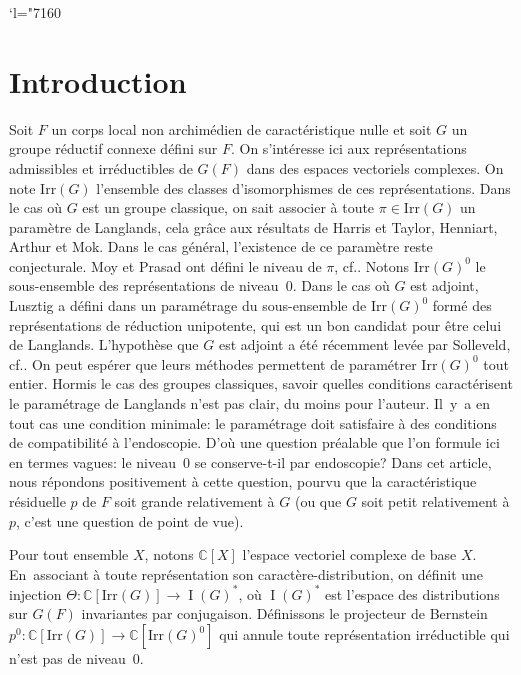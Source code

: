 \documentclass[11pt]{article}
\newcommand{\cf}{cf.\xspace}
\numberwithin{equation}{section}\providecommand{\og}{«\,}\providecommand{\fg}{\,»}
\newcommand{\Changel}{\mathcode`l="7160}
\newcommand{\Irr}{\mathrm{Irr}}
\DeclareMathOperator{\rI}{I}
\newcommand{\CC}{\mathbb{C}}
\theoremstyle{plain}
\theoremstyle{definition}
\begin{document}
\Changel

\vspace*{-1.2\baselineskip}\vskip0pt
\enlargethispage{.3\baselineskip}%
\section*{Introduction}

Soit $F$ un corps local non archimédien de caractéristique nulle et soit $G$ un groupe réductif connexe défini sur $F$. On s'intéresse ici aux représentations admissibles et irréductibles de $G(F)$ dans des espaces vectoriels complexes. On note $\Irr(G)$ l'ensemble des classes d'isomorphismes de ces représentations. Dans le cas où $G$ est un groupe classique, on sait associer à toute $\pi\in \Irr(G)$ un paramètre de Langlands, cela grâce aux résultats de Harris et Taylor, Henniart, Arthur et Mok. Dans le cas général, l'existence de ce paramètre reste conjecturale.
Moy et Prasad ont défini le niveau de $\pi$, \cf \cite[Th.\,5.2]{MP1}. Notons $\Irr(G)^0$ le sous-ensemble des représentations de niveau~$0$. Dans le cas où $G$ est adjoint, Lusztig a défini dans \cite{Lu} un paramétrage du sous-ensemble de $\Irr(G)^0$ formé des représentations de réduction unipotente, qui est un bon candidat pour être celui de Langlands. L'hypothèse que $G$ est adjoint a été récemment levée par Solleveld, \cf \cite{S}. On peut espérer que leurs méthodes permettent de paramétrer $\Irr(G)^0$ tout entier.
Hormis le cas des groupes classiques, savoir quelles conditions caractérisent le paramétrage de Langlands n'est pas clair, du moins pour l'auteur. Il~y~a en tout cas une condition minimale: le paramétrage doit satisfaire à des conditions de compatibilité à l'endoscopie. D'où une question préalable que l'on formule ici en termes vagues: le niveau~$0$ se conserve-t-il par endoscopie? Dans cet article, nous répondons positivement à cette question, pourvu que la caractéristique résiduelle $p$ de $F$ soit grande relativement à $G$ (ou que $G$ soit petit relativement à $p$, c'est une question de point de vue).

Pour tout ensemble $X$, notons $\CC[X]$ l'espace vectoriel complexe de base $X$. En~associant à toute représentation son caractère-distribution, on définit une injection $\Theta:\CC[\Irr(G)] \to \rI(G)^*$, où $\rI(G)^*$ est l'espace des distributions sur $G(F)$ invariantes par conjugaison. Définissons le projecteur de Bernstein $p^0:\CC[\Irr(G)]\to \CC[\Irr(G)^0]$ qui annule toute représentation irréductible qui n'est pas de niveau~$0$.
\end{document}
